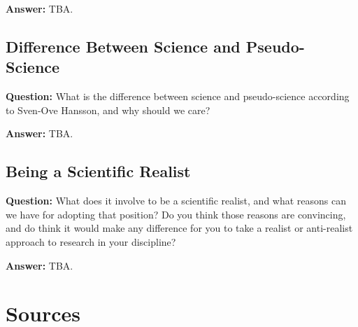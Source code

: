 \documentclass[11pt]{scrartcl}
\begin{document}
\bigbreak

\textbf{Answer:} TBA.

\subsection{Difference Between Science and Pseudo-Science}

\textbf{Question:} What is the difference between science and pseudo-science according to Sven-Ove Hansson, and why should we care?

\bigbreak

\textbf{Answer:} TBA.

\subsection{Being a Scientific Realist}

\textbf{Question:} What does it involve to be a scientific realist, and what reasons can we have for adopting that position? Do you think those reasons are convincing, and do think it would make any difference for you to take a realist or anti-realist approach to research in your discipline?

\bigbreak

\textbf{Answer:} TBA.

\section{Sources}



\end{document}
